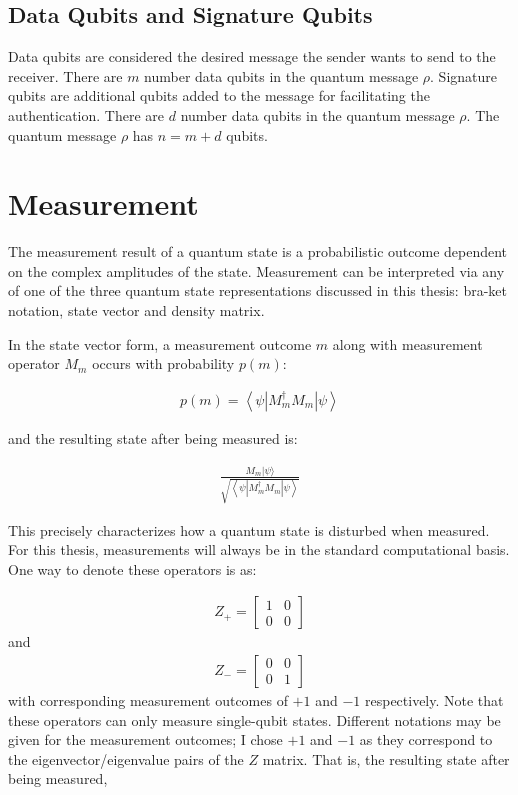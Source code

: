 \subsection{Data Qubits and Signature Qubits}
Data qubits are considered the desired message the sender wants to send to the receiver. There are $m$ number data qubits in the quantum message $\rho$. Signature qubits are additional qubits added to the message for facilitating the authentication. There are $d$ number data qubits in the quantum message $\rho$. The quantum message $\rho$ has $n = m + d$ qubits.
\section{Measurement}
\label{subsec:Measurements}
The measurement result of a quantum state is a probabilistic outcome dependent on the complex amplitudes of the state. Measurement can be interpreted via any of one of the three quantum state representations discussed in this thesis: bra-ket notation, state vector and density matrix.

In the state vector form, a measurement outcome $m$ along with measurement operator $M_m$ occurs with probability $p(m)$:

\begin{align}
p(m)=\left\langle\psi\left|M_{m}^{\dagger} M_{m}\right| \psi\right\rangle
\end{align}

and the resulting state after being measured is:

\begin{align}
\frac{M_{m}|\psi\rangle}{\sqrt{\left\langle\psi\left|M_{m}^{\dagger} M_{m}\right| \psi\right\rangle}}
\end{align}

This precisely characterizes how a quantum state is disturbed when measured. For this thesis, measurements will always be in the standard computational basis. One way to denote these operators is as:

\begin{align}
Z_+ = \left[\begin{array}{ll}
1 & 0 \\
0 & 0
\end{array}\right]
\end{align}
and
\begin{align}
Z_- = \left[\begin{array}{ll}
0 & 0 \\
0 & 1
\end{array}\right]
\end{align}
with corresponding measurement outcomes of $+1$ and $-1$ respectively. Note that these operators can only measure single-qubit states. Different notations may be given for the measurement outcomes; I chose $+1$ and $-1$ as they correspond to the eigenvector/eigenvalue pairs of the $Z$ matrix. That is, the resulting state after being measured,

